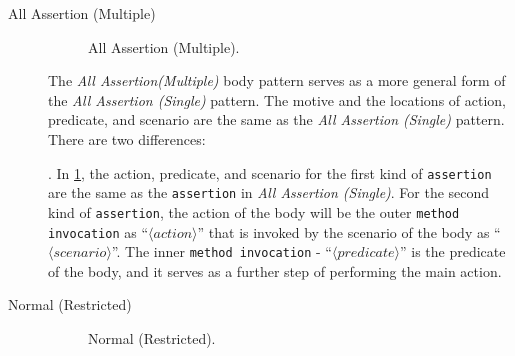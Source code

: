 \documentclass[proposal.tex]{subfiles}
\begin{document}
\begin{description}
\item[All Assertion (Multiple)] 

\begin{figure}[t]
\centering
    \begin{subfigure}{0.8\textwidth}
    \end{subfigure}
\caption{All Assertion (Multiple).}
\label{AllA_mutiple}
\end{figure}

The \textit{All Assertion(Multiple)} body pattern serves as a more general form of the \textit{All Assertion (Single)} pattern.
%
The motive and the locations of action, predicate, and scenario are the same as the \textit{All Assertion (Single)} pattern.
%
There are two differences:
.
%
In \cref{AllA_mutiple}, the action, predicate, and scenario for the first kind of \texttt{assertion} are the same as the \texttt{assertion} in \textit{All Assertion (Single)}.
%
For the second kind of \texttt{assertion}, the action of the body will be the outer \texttt{method invocation} as \enquote{$\langle action \rangle$} that is invoked by the scenario of the body as \enquote{$\langle scenario \rangle$}.
%
The inner \texttt{method invocation} - \enquote{$\langle predicate \rangle$} is the predicate of the body, and it serves as a further step of performing the main action.


\item[Normal (Restricted)] 

\begin{figure}[t]
\centering
    \begin{subfigure}{0.675\textwidth}
    \end{subfigure}
\caption{Normal (Restricted).}
\label{NP_2/3}
\end{figure}



\end{description}
\end{document}
